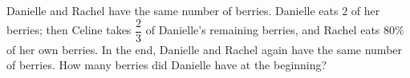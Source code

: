 Danielle and Rachel have the same number of berries. Danielle eats $2$ of her berries; then Celine takes $\dfrac{2}{3}$ of Danielle's remaining berries, and Rachel eats $80\%$ of her own berries. In the end, Danielle and Rachel again have the same number of berries. How many berries did Danielle have at the beginning?

